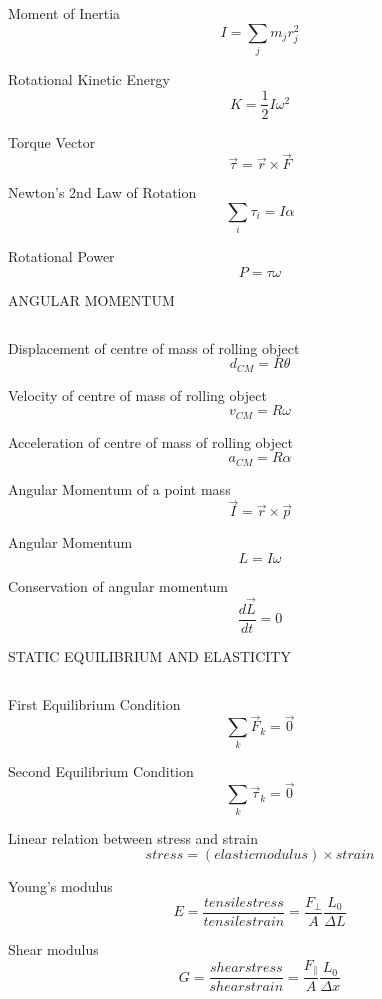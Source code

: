 \documentclass[12pt, letterpaper, twoside]{article}
\begin{document}
Moment of Inertia
$$ I = \sum_j m_j r_j^2 $$


Rotational Kinetic Energy
$$ K = \frac{1}{2} I \omega^2 $$


Torque Vector
$$ \overrightarrow{\tau} = \overrightarrow{r} \times \overrightarrow{F}$$



Newton's 2nd Law of Rotation
$$ \sum_i \tau_i = I \alpha $$



Rotational Power
$$ P = \tau \omega $$











\newpage



ANGULAR MOMENTUM

$$ $$



Displacement of centre of mass of rolling object
$$ d_{CM} = R \theta $$


Velocity of centre of mass of rolling object
$$ v_{CM} = R \omega $$


Acceleration of centre of mass of rolling object
$$ a_{CM} = R \alpha $$


Angular Momentum of a point mass
$$ \overrightarrow{I} = \overrightarrow{r} \times \overrightarrow{p} $$


Angular Momentum
$$  L = I \omega $$


Conservation of angular momentum
$$  \frac{d \overrightarrow{L}}{dt} = 0  $$





\newpage


STATIC EQUILIBRIUM AND ELASTICITY

$$ $$


First Equilibrium Condition
$$ \sum_k \overrightarrow{F}_k = \overrightarrow{0} $$


Second Equilibrium Condition
$$ \sum_k \overrightarrow{\tau}_k = \overrightarrow{0} $$


Linear relation between stress and strain
$$ stress = (elastic modulus) \times strain $$


Young's modulus
$$  E = \frac{tensile stress}{tensile strain} = \frac{F_\bot}{A} \frac{L_0}{\Delta L} $$


Shear modulus
$$  G = \frac{shear stress}{shear strain} = \frac{F_\parallel}{A} \frac{L_0}{\Delta x} $$
\end{document}
